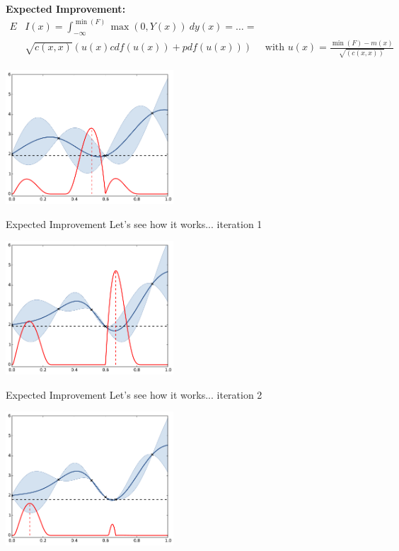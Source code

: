 \begin{frame}{}
\textbf{Expected Improvement:}
\begin{equation*}
\begin{split}
E&I(x) =  \int_{-\infty}^{\min(F)} \max\left(0,Y(x)\right) ~dy(x) = \dots = \\
& \sqrt{c(x,x)} (u(x) cdf(u(x)) + pdf(u(x))) \quad \text{ with } u(x) = \frac{\min(F) - m(x)}{\sqrt{(c(x,x))}}
\end{split}
\end{equation*}
\begin{center}
\includegraphics[height=5cm]{4_optimization/figures/python/ego_EI0}
\end{center}
\end{frame}

\begin{frame}{Expected Improvement}
Let's see how it works... iteration 1
\begin{center}
\includegraphics[height=5cm]{4_optimization/figures/python/ego_EI1}
\end{center}
\end{frame}

\begin{frame}[noframenumbering]{Expected Improvement}
Let's see how it works... iteration 2
\begin{center}
\includegraphics[height=5cm]{4_optimization/figures/python/ego_EI2}
\end{center}
\end{frame}

